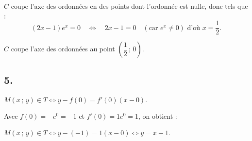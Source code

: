 \(C\) coupe l'axe des ordonnées en des points dont l'ordonnée est nulle, donc tels que :
\[
(2x - 1) e^x = 0 \quad \Longleftrightarrow \quad 2x - 1 = 0 \quad (\text{car } e^x \neq 0) \text{ d'où } x = \dfrac{1}{2}.
\]

\(C\) coupe l'axe des ordonnées au point \(\left(\dfrac{1}{2}\,;\,0\right)\).

\subsection*{5.}

\(M(x\,;\,y) \in T \Longleftrightarrow y - f(0) = f'(0)(x - 0).\)

Avec \(f(0) = -e^0 = -1\) et \(f'(0) = 1e^0 = 1\), on obtient :

\(M(x\,;\,y) \in T \Longleftrightarrow y - (-1) = 1(x - 0) \Longleftrightarrow y = x - 1.\)
